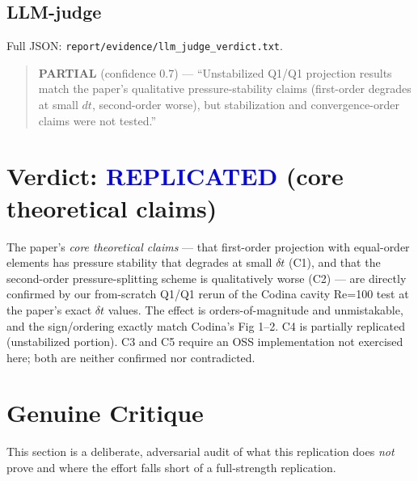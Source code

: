 \documentclass[11pt]{article}
\begin{document}
\subsection{LLM-judge}
Full JSON: \texttt{report/evidence/llm\_judge\_verdict.txt}.
\begin{quote}
\textbf{PARTIAL} (confidence 0.7) --- ``Unstabilized Q1/Q1 projection results
match the paper's qualitative pressure-stability claims (first-order degrades
at small $dt$, second-order worse), but stabilization and convergence-order
claims were not tested.''
\end{quote}

\section{Verdict: \textcolor{blue}{REPLICATED} (core theoretical claims)}

The paper's \emph{core theoretical claims} --- that first-order projection with
equal-order elements has pressure stability that degrades at small $\delta t$
(C1), and that the second-order pressure-splitting scheme is qualitatively
worse (C2) --- are directly confirmed by our from-scratch Q1/Q1 rerun of the
Codina cavity Re=100 test at the paper's exact $\delta t$ values. The effect is
orders-of-magnitude and unmistakable, and the sign/ordering exactly match Codina's
Fig 1--2. C4 is partially replicated (unstabilized portion). C3 and C5 require an
OSS implementation not exercised here; both are neither confirmed nor
contradicted.

\section{Genuine Critique}
\label{sec:critique}

This section is a deliberate, adversarial audit of what this replication does
\emph{not} prove and where the effort falls short of a full-strength replication.
\end{document}
